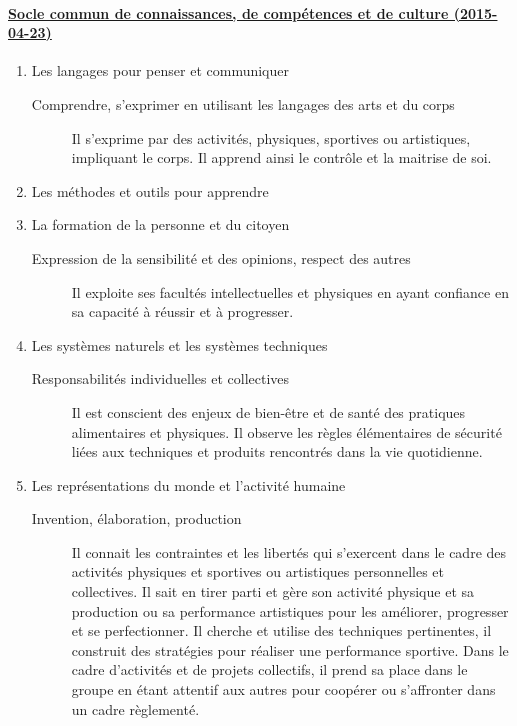 \documentclass[10pt,french,twocolumn,landscape,a4paper]{article}
\begin{document}
\paragraph{\href{http://www.education.gouv.fr/pid25535/bulletin_officiel.html&cid_bo=87834}{Socle commun de connaissances, de
compétences et de culture (2015-04-23)}}
\begin{enumerate}
\item Les langages pour penser et communiquer
	\begin{description}
	\item [Comprendre, s'exprimer en utilisant les langages des arts et du corps] Il s'exprime par des activités, physiques, sportives ou artistiques, impliquant le corps. Il apprend ainsi le contrôle et la maitrise de soi.
	\end{description}
\item Les méthodes et outils pour apprendre
\item La formation de la personne et du citoyen
	\begin{description}
	\item [Expression de la sensibilité et des opinions, respect des autres] Il exploite ses facultés intellectuelles et physiques en ayant confiance en sa capacité à réussir et à progresser.
	\end{description}
\item Les systèmes naturels et les systèmes techniques
	\begin{description}
	\item [Responsabilités individuelles et collectives] Il est conscient des enjeux de bien-être et de santé des pratiques alimentaires et physiques. Il observe les règles élémentaires de sécurité liées aux techniques et produits rencontrés dans la vie quotidienne.
	\end{description}
\item Les représentations du monde et l'activité humaine
	\begin{description}
	\item [Invention, élaboration, production] Il connait les contraintes et les libertés qui s'exercent dans le cadre des activités physiques et sportives ou artistiques personnelles et collectives. Il sait en tirer parti et gère son activité physique et sa production ou sa performance artistiques pour les améliorer, progresser et se perfectionner. Il cherche et utilise des techniques pertinentes, il construit des stratégies pour réaliser une performance sportive. Dans le cadre d'activités et de projets collectifs, il prend sa place dans le groupe en étant attentif aux autres pour coopérer ou s'affronter dans un cadre règlementé.
	\end{description}
\end{enumerate}
\end{document}
